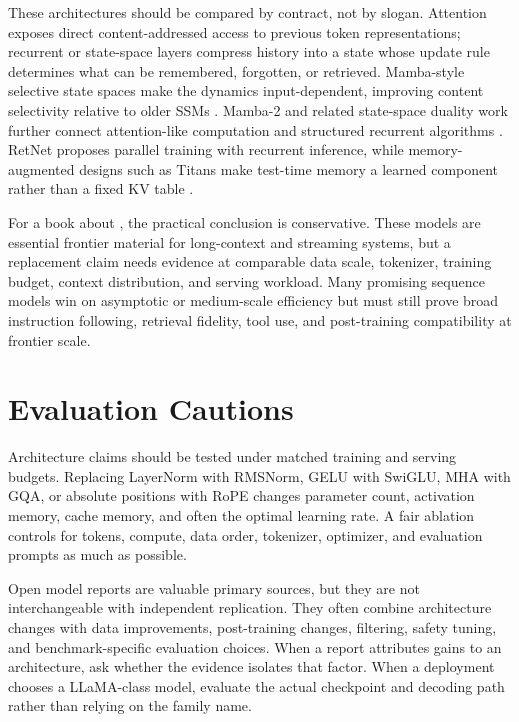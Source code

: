 These architectures should be compared by contract, not by slogan. Attention exposes direct content-addressed access to previous token representations; recurrent or state-space layers compress history into a state whose update rule determines what can be remembered, forgotten, or retrieved. Mamba-style selective state spaces make the dynamics input-dependent, improving content selectivity relative to older SSMs \cite{gu2023mamba}. Mamba-2 and related state-space duality work further connect attention-like computation and structured recurrent algorithms \cite{dao2024mamba2}. RetNet proposes parallel training with recurrent inference, while memory-augmented designs such as Titans make test-time memory a learned component rather than a fixed KV table \cite{sun2023retnet,behrouz2025titans}.

For a book about \llms, the practical conclusion is conservative. These models are essential frontier material for long-context and streaming systems, but a replacement claim needs evidence at comparable data scale, tokenizer, training budget, context distribution, and serving workload. Many promising sequence models win on asymptotic or medium-scale efficiency but must still prove broad instruction following, retrieval fidelity, tool use, and post-training compatibility at frontier scale.

\section{Evaluation Cautions}
\label{sec:llama-evaluation-cautions}

Architecture claims should be tested under matched training and serving budgets. Replacing LayerNorm with RMSNorm, GELU with SwiGLU, MHA with GQA, or absolute positions with RoPE changes parameter count, activation memory, cache memory, and often the optimal learning rate. A fair ablation controls for tokens, compute, data order, tokenizer, optimizer, and evaluation prompts as much as possible.

Open model reports are valuable primary sources, but they are not interchangeable with independent replication. They often combine architecture changes with data improvements, post-training changes, filtering, safety tuning, and benchmark-specific evaluation choices. When a report attributes gains to an architecture, ask whether the evidence isolates that factor. When a deployment chooses a LLaMA-class model, evaluate the actual checkpoint and decoding path rather than relying on the family name.

